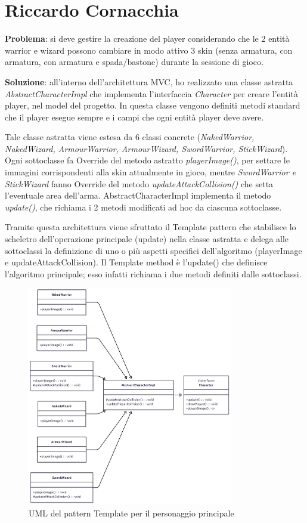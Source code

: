 \documentclass[a4paper,12pt]{report}
\begin{document}
\section{Riccardo Cornacchia}

\textbf{Problema}: si deve gestire la creazione del player considerando che le 2 entità warrior e wizard possono cambiare in modo attivo 3 skin
(senza armatura, con armatura, con armatura e spada/bastone) durante la sessione di gioco.\vspace{1cm}

\textbf{Soluzione}: all'interno dell'architettura MVC, ho realizzato una classe astratta \emph{AbstractCharacterImpl} che implementa l'interfaccia 
\emph{Character} per creare l'entità player, nel model del progetto. In questa classe vengono definiti metodi standard che il player esegue sempre 
e i campi che ogni entità player deve avere.

Tale classe astratta viene estesa da 6 classi concrete (\emph{NakedWarrior, NakedWizard, ArmourWarrior, ArmourWizard, SwordWarrior, 
StickWizard}). Ogni sottoclasse fa Override del metodo astratto \emph{playerImage()}, per settare le immagini corrispondenti alla skin 
attualmente in gioco, mentre \emph{SwordWarrior e StickWizard} fanno Override del metodo \emph{updateAttackCollision()} che setta l'eventuale area dell'arma.
AbstractCharacterImpl implementa il metodo \emph{update()}, che richiama i 2 metodi modificati ad hoc da ciascuna sottoclasse.

Tramite questa architettura viene sfruttato il Template pattern che stabilisce lo scheletro dell'operazione 
principale (update) nella classe astratta e delega alle sottoclassi la definizione di uno o più aspetti specifici dell'algoritmo 
(playerImage e updateAttackCollision). Il Template method è l'update() che definisce l'algoritmo principale; esso infatti richiama i due 
metodi definiti dalle sottoclassi.

\begin{figure}
    \centering
    \includegraphics[width=0.8\textwidth]{resources/TemplateCharacter.png}
    \caption{UML del pattern Template per il personaggio principale}
    \label{fig:2.1}
\end{figure}
\end{document}
